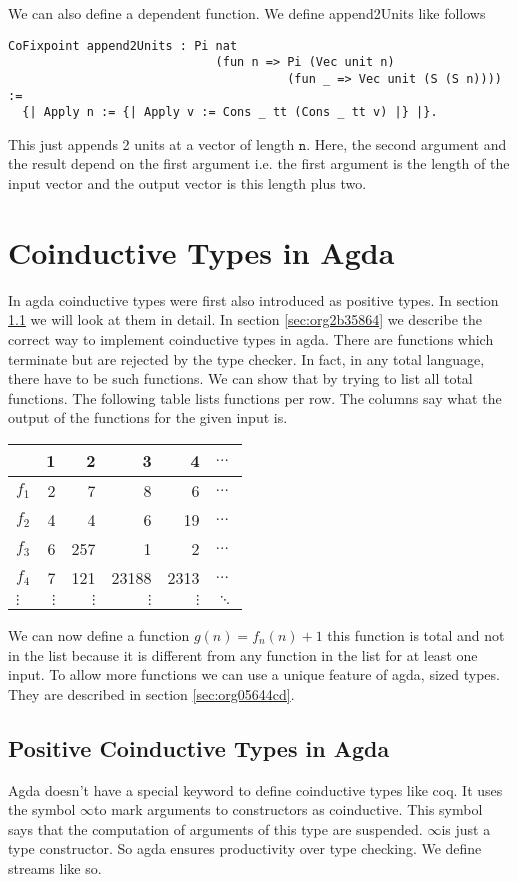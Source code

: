 \documentclass[a4paper,cleardoubleempty,BCOR1cm]{scrbook}
\begin{document}
We can also define a dependent function.  We define append2Units like
follows
\begin{verbatim}
CoFixpoint append2Units : Pi nat
                             (fun n => Pi (Vec unit n)
                                       (fun _ => Vec unit (S (S n)))) :=
  {| Apply n := {| Apply v := Cons _ tt (Cons _ tt v) |} |}.
\end{verbatim}
This just appends 2 units at a vector of length $\mathtt{n}$.  Here, the second
argument and the result depend on the first argument i.e. the first argument
is the length of the input vector and the output vector is this length plus
two.

\section{Coinductive Types in Agda}
\label{sec:org986a982}
In agda coinductive types were first also introduced as positive types. In
section \ref{sec:org3d29d3d} we will look at them in
detail. In section \ref{sec:org2b35864} we describe the correct
way to implement coinductive types in agda. There are functions which
terminate but are rejected by the type checker. In fact, in any total language,
there have to be such functions. We can show that by trying to list all total
functions. The following table lists functions per row. The columns say what
the output of the functions for the given input is.
\begin{center}
\begin{tabular}{lrrrrl}
 & 1 & 2 & 3 & 4 & \(\dots\)\\
\hline
\(f_1\) & 2 & 7 & 8 & 6 & \(\dots\)\\
\(f_2\) & 4 & 4 & 6 & 19 & \(\dots\)\\
\(f_3\) & 6 & 257 & 1 & 2 & \(\dots\)\\
\(f_4\) & 7 & 121 & 23188 & 2313 & \(\dots\)\\
\(\vdots\) & \(\vdots\) & \(\vdots\) & \(\vdots\) & \(\vdots\) & \(\ddots\)\\
\end{tabular}
\end{center}
We can now define a function \(g(n)=f_n(n)+1\) this function is total and not
in the list because it is different from any function in the list for at least
one input.  To allow more functions we can use a unique feature of agda, sized
types. They are described in section \ref{sec:org05644cd}.

\subsection{Positive Coinductive Types in Agda}
\label{sec:org3d29d3d}
Agda doesn't have a special keyword to define coinductive types like coq.  It
uses the symbol $\mathtt{\infty}$\;to mark arguments to constructors as coinductive.
This symbol says that the computation of arguments of this type are suspended.
$\mathtt{\infty}$\;is just a type constructor.  So agda ensures productivity over type
checking. We define streams like so.
\end{document}
